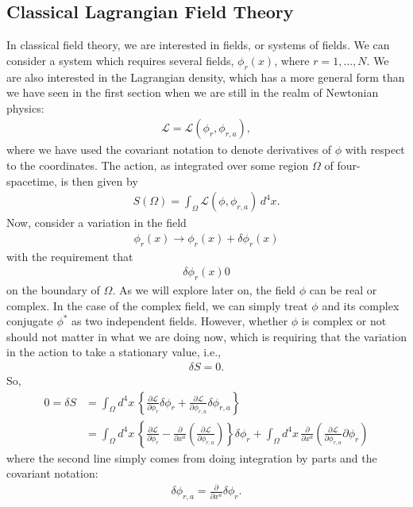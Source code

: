 \documentclass[a4paper,11pt]{article}
\numberwithin{equation}{section}
\theoremstyle{definition}
\newcommand{\p}{\partial}
\newcommand{\lag}{\mathcal{L}}
\begin{document}
\subsection{Classical Lagrangian Field Theory}
In classical field theory, we are interested in fields, or systems of fields. We can consider a system which requires several fields, $\phi_r(x)$, where $r=1,\dots,N$. We are also interested in the Lagrangian density, which has a more general form than we have seen in the first section when we are still in the realm of Newtonian physics:
\begin{align}
\lag = \lag(\phi_r, \phi_{r,a}),
\end{align}
where we have used the covariant notation to denote derivatives of $\phi$ with respect to the coordinates. The action, as integrated over some region $\Omega$ of four-spacetime, is then given by
\begin{align}
S(\Omega) = \int_\Omega \lag(\phi, \phi_{r,a})\,d^4x.
\end{align}
Now, consider a variation in the field
\begin{align}
\phi_r(x) \to \phi_r(x) + \delta \phi_r(x)
\end{align}
with the requirement that
\begin{align}
\delta \phi_r(x) 0
\end{align}
 on the boundary of $\Omega$. As we will explore later on, the field $\phi$ can be real or complex. In the case of the complex field, we can simply treat $\phi$ and its complex conjugate $\phi^*$ as two independent fields. However, whether $\phi$ is complex or not should not matter in what we are doing now, which is requiring that the variation in the action to take a stationary value, i.e.,
 \begin{align}
 \delta S = 0.
 \end{align}
So,
\begin{align}
0 = \delta S &= \int_\Omega  d^4x\,\left\{ \frac{\p\lag}{\p\phi_r}\delta \phi_r + \frac{\p\lag}{\p\phi_{r,a}}\delta \phi_{r,a}    \right\}\\
&= \int_\Omega d^4x\, \left\{ \frac{\p\lag}{\p\phi_r} - \frac{\p}{\p x^a}\left( \frac{\p\lag}{\p\phi_{r,a}} \right) \right\}\delta \phi_r +  \int_\Omega d^4x\,\frac{\p}{\p x^a}\left(\frac{\p\lag}{\p\phi_{r,a}}\p \phi_r \right)
\end{align}
where the second line simply comes from doing integration by parts and the covariant notation:
\begin{align}
\delta \phi_{r,a} = \frac{\p}{\p x^a}\delta \phi_r.
\end{align}
\end{document}
